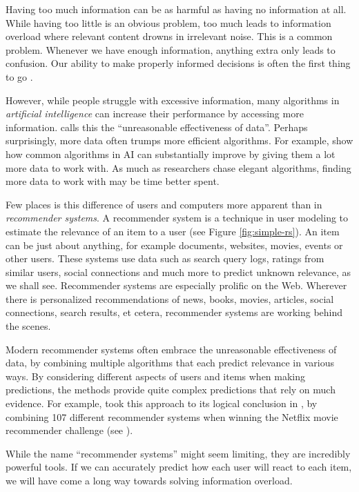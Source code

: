 \label{chap:intro}

Having too much information can be as harmful as having no information at all.
While having too little is an obvious problem,
too much leads to information overload where relevant content drowns in irrelevant noise.
This is a common problem. Whenever we have enough information,
anything extra only leads to confusion.
Our ability to make properly informed decisions is often the first thing to go
\cite[p1]{Davenport2001}.

However, while people struggle with excessive information,
many algorithms in \emph{artificial intelligence}  
can increase their performance by accessing more information.
\citet[p1]{Halevy2009} calls this the ``unreasonable effectiveness of data''.
Perhaps surprisingly, more data often trumps more efficient algorithms.
For example, \citet[p3]{Banko2001} show how common algorithms in AI 
can substantially improve by giving them a lot more data to work with.
As much as researchers chase elegant algorithms, finding more data to work with may be time better spent.

Few places is this difference of users and computers more apparent than in \emph{recommender systems}.
A recommender system is a technique in user modeling to estimate the relevance of an item to a user
(see Figure \ref{fig:simple-rs}).
An item can be just about anything, for example documents, websites, movies, events or other users.
These systems use data such as search query logs, 
ratings from similar users, social connections and much more
to predict unknown relevance, as we shall see.
Recommender systems are especially prolific on the Web. 
Wherever there is personalized recommendations of news, books, movies,
articles, social connections, search results, et cetera, recommender systems are working behind the scenes.

Modern recommender systems often embrace the 
unreasonable effectiveness of data,
by combining multiple algorithms that each predict relevance in various ways.
By considering different aspects of users and items when making predictions,
the methods provide quite complex predictions that rely on much evidence.
For example, \citeauthor{Bell2007} took this approach to its logical conclusion in \citet[p1]{Bell2007}, by 
combining 107 different recommender systems when winning the 
Netflix movie recommender challenge
(see \citet{Linden2009}).

While the name ``recommender systems'' might seem limiting, they are incredibly powerful tools.
If we can accurately predict how each user will react to each item,
we will have come a long way towards solving information overload.

